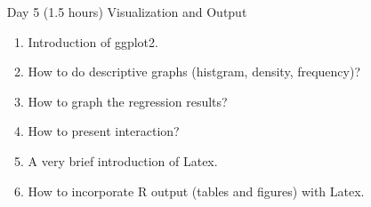 \documentclass[12pt]{scrartcl}
\begin{document}
\begin{itemize}
\begin{enumerate}
		\end{enumerate}
	\item[Day 5] (1.5 hours) Visualization and Output
		\begin{enumerate}
			\item Introduction of ggplot2.
			\item How to do descriptive graphs (histgram, density, frequency)?
			\item How to graph the regression results?
			\item How to present interaction?
			\item A very brief introduction of Latex.
			\item How to incorporate R output (tables and figures) with Latex. 
		\end{enumerate}
\end{itemize}
\end{document}
